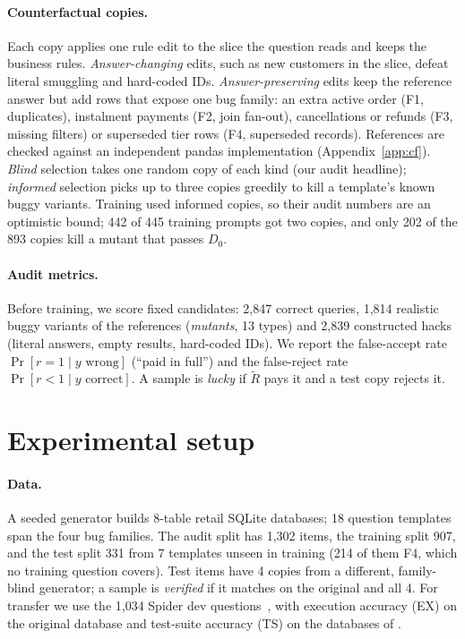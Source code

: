 \documentclass{article}
\begin{document}
\paragraph{Counterfactual copies.}
Each copy applies one rule edit to the slice the question reads and keeps the business rules. \emph{Answer-changing} edits, such as new customers in the slice, defeat literal smuggling and hard-coded IDs. \emph{Answer-preserving} edits keep the reference answer but add rows that expose one bug family: an extra active order (F1, duplicates), instalment payments (F2, join fan-out), cancellations or refunds (F3, missing filters) or superseded tier rows (F4, superseded records). References are checked against an independent pandas implementation (Appendix~\ref{app:cf}). \emph{Blind} selection takes one random copy of each kind (our audit headline); \emph{informed} selection picks up to three copies greedily to kill a template's known buggy variants. Training used informed copies, so their audit numbers are an optimistic bound; 442 of 445 training prompts got two copies, and only 202 of the 893 copies kill a mutant that passes $D_0$.

\paragraph{Audit metrics.}
Before training, we score fixed candidates: 2,847 correct queries, 1,814 realistic buggy variants of the references (\emph{mutants}, 13 types) and 2,839 constructed hacks (literal answers, empty results, hard-coded IDs). We report the false-accept rate $\Pr[r=1 \mid y \text{ wrong}]$ (``paid in full'') and the false-reject rate $\Pr[r<1 \mid y \text{ correct}]$. A sample is \emph{lucky} if $\tilde R$ pays it and a test copy rejects it.

\section{Experimental setup}
\label{sec:setup}

\paragraph{Data.}
A seeded generator builds 8-table retail SQLite databases; 18 question templates span the four bug families. The audit split has 1,302 items, the training split 907, and the test split 331 from 7 templates unseen in training (214 of them F4, which no training question covers). Test items have 4 copies from a different, family-blind generator; a sample is \emph{verified} if it matches on the original and all 4. For transfer we use the 1,034 Spider dev questions~\citep{yu-etal-2018-spider}, with execution accuracy (EX) on the original database and test-suite accuracy (TS) on the databases of \citet{zhong2020semantic}.
\end{document}
